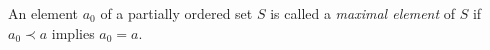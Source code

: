 An element $a_0$ of a partially ordered set $S$ is called a \textit{maximal element} of $S$ if $a_0 \prec a$ implies $a_0 = a$.
